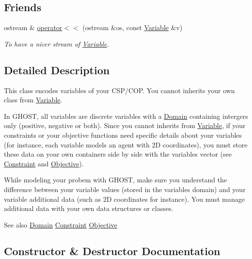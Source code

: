 \subsection*{Friends}
\begin{DoxyCompactItemize}
\item 
ostream \& \hyperlink{classghost_1_1Variable_af674a590cfa8082686f61b22cbb15790}{operator$<$$<$} (ostream \&os, const \hyperlink{classghost_1_1Variable}{Variable} \&v)
\begin{DoxyCompactList}\small\item\em To have a nicer stream of \hyperlink{classghost_1_1Variable}{Variable}. \end{DoxyCompactList}\end{DoxyCompactItemize}


\subsection{Detailed Description}
This class encodes variables of your C\+S\+P/\+C\+OP. You cannot inherits your own class from \hyperlink{classghost_1_1Variable}{Variable}. 

In G\+H\+O\+ST, all variables are discrete variables with a \hyperlink{classghost_1_1Domain}{Domain} containing intergers only (positive, negative or both). Since you cannot inherits from \hyperlink{classghost_1_1Variable}{Variable}, if your constraints or your objective functions need specific details about your variables (for instance, each variable models an agent with 2D coordinates), you must store these data on your own containers side by side with the variables vector (see \hyperlink{classghost_1_1Constraint}{Constraint} and \hyperlink{classghost_1_1Objective}{Objective}).

While modeling your probem with G\+H\+O\+ST, make sure you understand the difference between your variable values (stored in the variable\textquotesingle{}s domain) and your variable additional data (such as 2D coordinates for instance). You must manage additional data with your own data structures or classes.

\begin{DoxySeeAlso}{See also}
\hyperlink{classghost_1_1Domain}{Domain} \hyperlink{classghost_1_1Constraint}{Constraint} \hyperlink{classghost_1_1Objective}{Objective} 
\end{DoxySeeAlso}


\subsection{Constructor \& Destructor Documentation}
